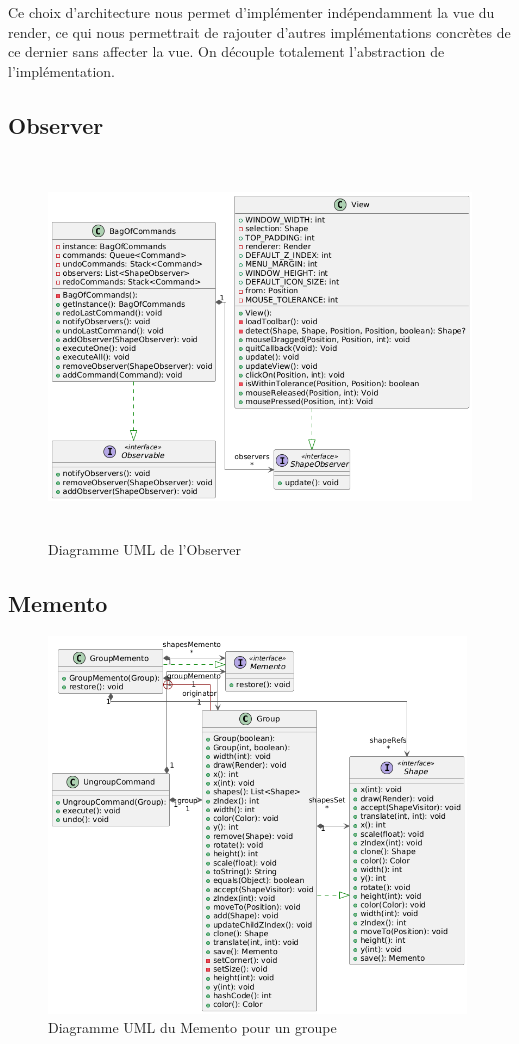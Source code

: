 \documentclass{article}
\begin{document}
Ce choix d'architecture nous permet d'implémenter indépendamment la vue du render, ce qui nous permettrait de rajouter d'autres
implémentations concrètes de ce dernier sans affecter la vue.
On découple totalement l'abstraction de l'implémentation.
\FloatBarrier
\subsection{Observer}
\begin{figure}[h]
    \centering
    \includegraphics[width=\textwidth,height=10.0cm,keepaspectratio]{observer.png}
    \caption{Diagramme UML de l'Observer}
    \label{Observer}
\end{figure}
\FloatBarrier

\subsection{Memento}
\begin{figure}[h]
    \centering
    \includegraphics[width=\textwidth,height=10.0cm,keepaspectratio]{memento.png}
    \caption{Diagramme UML du Memento pour un groupe}
    \label{MementoGroupe}
\end{figure}
\FloatBarrier
\end{document}
